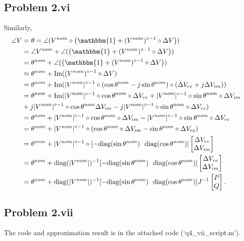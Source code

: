 \subsection*{Problem 2.vi}
Similarly,
\begin{align*}
	\angle V &= \theta = \angle (V^{nom} \circ \left(\mathbbm{1} + (V^{nom})^{\circ -1}\circ \Delta V\right))\\
	&= \angle V^{nom} + \angle(\left(\mathbbm{1} + (V^{nom})^{\circ -1}\circ \Delta V\right))\\
	&= \theta^{nom} + \angle(\left(\mathbbm{1} + (V^{nom})^{\circ -1}\circ \Delta V\right))\\
	&\approx \theta^{nom} + \text{Im}((V^{nom})^{\circ -1}\circ \Delta V)\\
	&= \theta^{nom} + \text{Im}(|V^{nom}|^{\circ-1} \circ (\cos \theta^{nom}-j\sin\theta^{nom})\circ (\Delta V_{re} + j \Delta V_{im}))\\
	&= \theta^{nom} + \text{Im}(|V^{nom}|^{\circ-1} \circ \cos\theta^{nom} \circ \Delta V_{re} + |V^{nom}|^{\circ-1} \circ \sin\theta^{nom}\circ \Delta V_{im}\\
	&+ j |V^{nom}|^{\circ-1} \circ \cos\theta^{nom}\Delta V_{im}-j|V^{nom}|^{\circ-1} \circ \sin\theta^{nom}\circ \Delta V_{re})\\
	&= \theta^{nom} + |V^{nom}|^{\circ-1} \circ \cos\theta^{nom}\circ\Delta V_{im}-|V^{nom}|^{\circ-1} \circ \sin\theta^{nom}\circ \Delta V_{re}\\
	&= \theta^{nom}+ |V^{nom}|^{\circ-1} \circ (\cos\theta^{nom}\circ\Delta V_{im} - \sin\theta^{nom}\circ \Delta V_{re})\\
	&= \theta^{nom} + |V^{nom}|^{\circ-1} \circ [-\text{diag}(\sin\theta^{nom})\ \ \text{diag}(\cos\theta^{nom})] \begin{bmatrix}
		\Delta V_{re}\\\Delta V_{im}
	\end{bmatrix}\\
	&= \theta^{nom} + \text{diag}(|V^{nom}|)^{-1}[-\text{diag}(\sin\theta^{nom})\ \ \text{diag}(\cos\theta^{nom})] \begin{bmatrix}
	\Delta V_{re}\\\Delta V_{im}
	\end{bmatrix}\\
	&= \theta^{nom} + \text{diag}(|V^{nom}|)^{-1}[-\text{diag}(\sin\theta^{nom})\ \ \text{diag}(\cos\theta^{nom})]J^{-1}\begin{bmatrix}
	P\\Q
	\end{bmatrix}.
\end{align*}
\subsection*{Problem 2.vii}
The code and approximation result is in the attached code (`q4\_vii\_script.m').